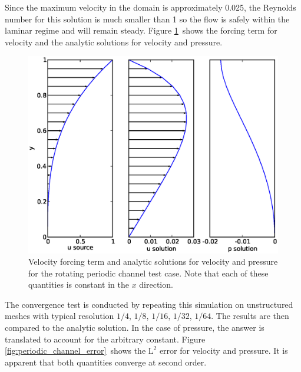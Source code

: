 Since the maximum velocity in the domain is approximately 0.025, the
Reynolds number for this solution is much smaller than 1 so the flow is
safely within the laminar regime and will remain steady. Figure
\ref{fig:periodic_channel}\ shows the forcing term for velocity and the
analytic solutions for velocity and pressure.


\begin{figure}[htbp]
  \centering
  \onlypdf{\begin{pdfdisplay}}
    \includegraphics[width=1.1\textwidth]{examples_images/rotating_channel/analytic_solution.eps}
  \onlypdf{\end{pdfdisplay}}
  \caption{Velocity forcing term and analytic solutions for velocity and
    pressure for the rotating periodic channel test case. Note that each of
    these quantities is constant in the $x$ direction.}
  \label{fig:periodic_channel}
\end{figure}

The convergence test is conducted by repeating this simulation on unstructured meshes
with typical resolution $1/4$, $1/8$, $1/16$, $1/32$, $1/64$. The results
are then compared to the analytic solution. In the case of pressure, the
answer is translated to account for the arbitrary constant. Figure
\ref{fig:periodic_channel_error}\ shows the $\textrm{L}^2$ error for
velocity and pressure. It is apparent that both quantities converge at
second order.

